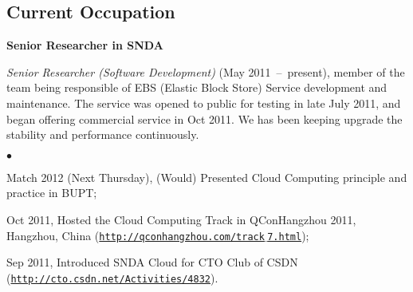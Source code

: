 \documentclass[a4paper,margin,line]{res}
\newenvironment{list1}{
  \begin{list}{\ding{113}}{%
      \setlength{\itemsep}{0in}
      \setlength{\parsep}{0in} \setlength{\parskip}{0in}
      \setlength{\topsep}{0in} \setlength{\partopsep}{0in} 
      \setlength{\leftmargin}{0.17in}}}{\end{list}}
\newenvironment{list2}{
  \begin{list}{$\bullet$}{%
      \setlength{\itemsep}{0in}
      \setlength{\parsep}{0in} \setlength{\parskip}{0in}
      \setlength{\topsep}{0in} \setlength{\partopsep}{0in} 
      \setlength{\leftmargin}{0.2in}}}{\end{list}}
\newcommand{\http}{http:/\hspace{-0.3ex}/}
\begin{document}
\begin{resume}
\section{\sc Current Occupation}
\textbf{Senior Researcher in SNDA}\\
\vspace*{-.1in}
\begin{list1}
\item[] \emph{Senior Researcher (Software Development)}\/ (May 2011~--~present), member of the team being responsible of EBS (Elastic Block Store) Service development and maintenance. The service was opened to public for testing in late July 2011, and began offering commercial service in Oct 2011. We has been keeping upgrade the stability and performance continuously.  
\begin{list2}
\vspace*{.05in}
\item Match 2012 (Next Thursday), (Would) Presented Cloud Computing principle and practice in BUPT;
\item Oct 2011, Hosted the Cloud Computing Track in QConHangzhou 2011, Hangzhou, China (\href{http://qconhangzhou.com/track_7.html}{\tt\http{}qconhangzhou.com/track$\underline{}$7.html});
\item Sep 2011, Introduced SNDA Cloud for CTO Club of CSDN \\(\href{http://cto.csdn.net/Activities/4832}{\tt\http{}cto.csdn.net/Activities/4832}).
\end{list2}
\end{list1}


\end{resume}
\end{document}
